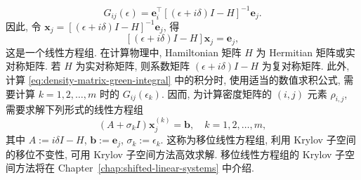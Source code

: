 \[G_{ij}(\epsilon)=\boldsymbol{e}_i^{\top}[(\epsilon+i\delta)I-H]^{-1}\boldsymbol{e}_j.\]
{因此, 令 $\boldsymbol{x}_j=[(\epsilon+i\delta)I-H]^{-1}\boldsymbol{e}_j$, 得}
\[[(\epsilon+i\delta)I-H]\boldsymbol{x}_j=\boldsymbol{e}_j,\]
{这是一个线性方程组. 在计算物理中, Hamiltonian 矩阵 $H$ 为 Hermitian 矩阵或实对称矩阵. 若 $H$ 为实对称矩阵, 则系数矩阵 $(\epsilon+i\delta)I-H$ 为复对称矩阵. 此外, 计算 \eqref{eq:density-matrix-green-integral} 中的积分时, 使用适当的数值求积公式, 需要计算 $k=1,2,\ldots,m$ 时的 $G_{ij}(\epsilon_k)$. 因而, 为计算密度矩阵的 $(i,j)$ 元素 $\rho_{i,j}$, 需要求解下列形式的线性方程组}
\[(A+\sigma_kI)\boldsymbol{x}_j^{(k)}=\boldsymbol{b},\quad k=1,2,\ldots,m,\]
{其中 $A:=i\delta I-H$, $\boldsymbol{b}:=\boldsymbol{e}_j$, $\sigma_k:=\epsilon_k$. 这称为移位线性方程组, 利用 Krylov 子空间的移位不变性, 可用 Krylov 子空间方法高效求解. 移位线性方程组的 Krylov 子空间方法将在 Chapter\ \ref{chap:shifted-linear-systems} 中介绍.}
